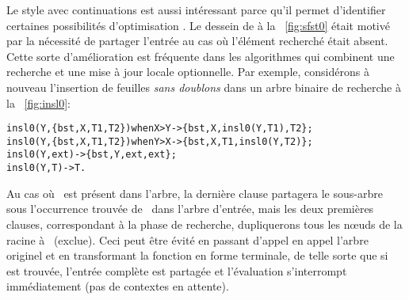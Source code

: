  Le style
avec continuations est aussi intéressant parce qu'il permet
d'identifier certaines possibilités d'optimisation
\citep{Danvy_2004}. Le dessein de  à la
\fig~\vref{fig:sfst0} était motivé par la nécessité de partager
l'entrée au cas où l'élément recherché était absent. Cette sorte
d'amélioration est fréquente dans les algorithmes qui combinent une
recherche et une mise à jour locale optionnelle. Par exemple,
considérons à nouveau l'insertion de feuilles \emph{sans doublons}
dans un arbre binaire de recherche à
la \fig~\vref{fig:insl0}:
\begin{alltt}
insl0(Y,\{bst,X,T1,T2\}) when X > Y -> \{bst,X,insl0(Y,T1),T2\};
insl0(Y,\{bst,X,T1,T2\}) when Y > X -> \{bst,X,T1,insl0(Y,T2)\};
insl0(Y,          ext)            -> \{bst,Y,ext,ext\};
insl0(Y,            T)            -> T.
\end{alltt}
Au cas où ~est présent dans l'arbre, la dernière clause
partagera le sous-arbre sous l'occurrence trouvée de~ dans
l'arbre d'entrée, mais les deux premières clauses, correspondant à la
phase de recherche, dupliquerons tous les nœuds de la racine
à~ (exclue). Ceci peut être évité en passant d'appel en
appel l'arbre originel et en transformant la fonction en forme
terminale, de telle sorte que si~ est trouvée, l'entrée
complète est partagée et l'évaluation s'interrompt immédiatement (pas
de contextes en attente).


